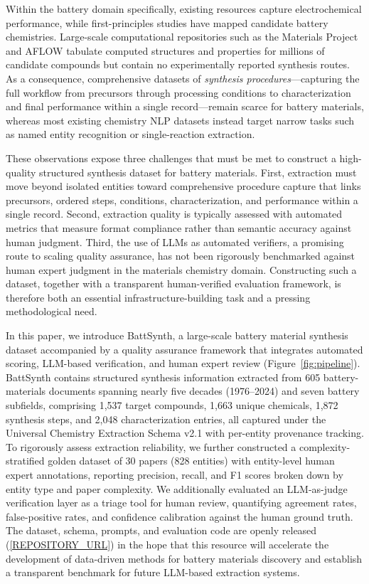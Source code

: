 \documentclass[12pt,a4paper]{article}
\begin{document}
Within the battery domain specifically, existing resources capture electrochemical performance,\cite{dahn2024battery} while first-principles studies have mapped candidate battery chemistries.\cite{ceder2010opportunities} Large-scale computational repositories such as the Materials Project\cite{jain2013commentary} and AFLOW\cite{curtarolo2012aflow} tabulate computed structures and properties for millions of candidate compounds but contain no experimentally reported synthesis routes. As a consequence, comprehensive datasets of \textit{synthesis procedures}---capturing the full workflow from precursors through processing conditions to characterization and final performance within a single record---remain scarce for battery materials, whereas most existing chemistry NLP datasets instead target narrow tasks such as named entity recognition or single-reaction extraction.\cite{lowe2012extraction,mysore2019materials}

These observations expose three challenges that must be met to construct a high-quality structured synthesis dataset for battery materials. First, extraction must move beyond isolated entities toward comprehensive procedure capture that links precursors, ordered steps, conditions, characterization, and performance within a single record. Second, extraction quality is typically assessed with automated metrics that measure format compliance rather than semantic accuracy against human judgment.\cite{kononova2019text} Third, the use of LLMs as automated verifiers, a promising route to scaling quality assurance, has not been rigorously benchmarked against human expert judgment in the materials chemistry domain. Constructing such a dataset, together with a transparent human-verified evaluation framework, is therefore both an essential infrastructure-building task and a pressing methodological need.

In this paper, we introduce BattSynth, a large-scale battery material synthesis dataset accompanied by a quality assurance framework that integrates automated scoring, LLM-based verification, and human expert review (Figure~\ref{fig:pipeline}). BattSynth contains structured synthesis information extracted from 605 battery-materials documents spanning nearly five decades (1976--2024) and seven battery subfields, comprising 1,537 target compounds, 1,663 unique chemicals, 1,872 synthesis steps, and 2,048 characterization entries, all captured under the Universal Chemistry Extraction Schema v2.1 with per-entity provenance tracking. To rigorously assess extraction reliability, we further constructed a complexity-stratified golden dataset of 30 papers (828 entities) with entity-level human expert annotations, reporting precision, recall, and F1 scores broken down by entity type and paper complexity. We additionally evaluated an LLM-as-judge verification layer as a triage tool for human review, quantifying agreement rates, false-positive rates, and confidence calibration against the human ground truth. The dataset, schema, prompts, and evaluation code are openly released (\url{[REPOSITORY_URL]}) in the hope that this resource will accelerate the development of data-driven methods for battery materials discovery and establish a transparent benchmark for future LLM-based extraction systems.
\end{document}
